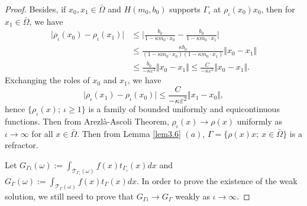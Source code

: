 \documentclass[a4paper,12pt,]{article}
\numberwithin{equation}{section}
\numberwithin{equation}{section} \allowdisplaybreaks
\begin{document}
\begin{proof}
  Besides, if $x_{0}, x_{1} \in \bar{\Omega}$ and $H(m_{0},b_{0})$ supports $\Gamma_{\iota}$ at $\rho_{\iota}(x_{0})x_{0}$, then for $x_{1} \in \bar{\Omega}$, we have
  \begin{align*}
    \vert \rho_{\iota}(x_{0}) - \rho_{\iota}(x_{1}) \vert & \leq \vert \frac{b_{0}}{1 - \kappa m_{0} \cdot x_{0}} - \frac{b_{0}}{1 - \kappa m_{0} \cdot x_{1}} \vert \\
      & \leq \frac{\kappa b_{0}}{(1 - \kappa m_{0} \cdot x_{0})(1 - \kappa m_{0} \cdot x_{1})} \Vert x_{0} - x_{1} \Vert \\
      & \leq \frac{b_{0}}{-\kappa \varepsilon^{2}} \Vert x_{0} - x_{1} \Vert  
        \leq \frac{C}{-\kappa \varepsilon^{2}} \Vert x_{0} - x_{1} \Vert.
  \end{align*}
  Exchanging the roles of $x_{0}$ and $x_{1}$, we have
  $$\vert \rho_{\iota}(x_{1}) - \rho_{\iota}(x_{0}) \vert \leq \frac{C}{-\kappa \varepsilon^{2}} \Vert x_{1} - x_{0} \Vert,$$
  hence $\{\rho_{\iota}(x);~\iota \geq 1\}$ is a family of bounded uniformly and equicontinuous functions. Then from Arezlà-Ascoli Theorem, $\rho_{\iota}(x) \rightarrow \rho(x)$ uniformly as $\iota \rightarrow \infty$ for all $x \in \bar{\Omega}$. Then from Lemma \ref{lem3.6} $(a)$, $\Gamma = \{\rho(x)x;~x \in \bar{\Omega}\}$ is a refractor. 
  
  Let $G_{\Gamma{\iota}}(\omega) := \displaystyle \int_{\mathcal{T}_{\Gamma_{\iota}}(\omega)}f(x)t_{\Gamma_{\iota}}(x)dx$ and $G_{\Gamma}(\omega) := \displaystyle \int_{\mathcal{T}_{\Gamma}(\omega)}f(x)t_{\Gamma}(x)dx$. In order to prove the existence of the weak solution, we still need to prove that $G_{\Gamma{\iota}} \rightarrow G_{\Gamma}$ weakly as $\iota \rightarrow \infty$.
  

\end{proof}
\end{document}
